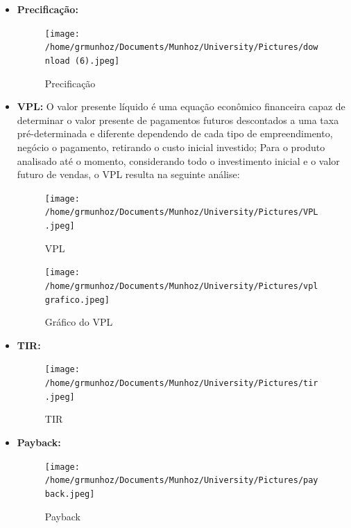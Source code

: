 \documentclass[
	12pt,				%
	openright,			%
	oneside,			%
	a4paper,			%
	english,			%
	french,				%
	spanish,			%
	brazil				%
	]{abntex2}
\begin{document}
\begin{itemize}
\item \textbf{Precificação:}

\begin{figure}[H]
\begin{center}
\caption{Precificação}
\texttt{[image: /home/grmunhoz/Documents/Munhoz/University/Pictures/download (6).jpeg]} 
\end{center}
\end{figure}	

\item \textbf{VPL:}
\subitem O valor presente líquido é uma equação econômico financeira capaz de determinar o valor presente de pagamentos futuros descontados a uma taxa pré-determinada e diferente dependendo de cada tipo de empreendimento, negócio o pagamento, retirando o custo inicial investido;
\subitem Para o produto analisado até o momento, considerando todo o investimento inicial e o valor futuro de vendas, o VPL resulta na seguinte análise:

\begin{figure}[H]
\begin{center}
\caption{VPL}
\texttt{[image: /home/grmunhoz/Documents/Munhoz/University/Pictures/VPL.jpeg]} 
\end{center}
\end{figure}	

\begin{figure}[H]
\begin{center}
\caption{Gráfico do VPL}
\texttt{[image: /home/grmunhoz/Documents/Munhoz/University/Pictures/vplgrafico.jpeg]} 
\end{center}
\end{figure}	

\item \textbf{TIR:}

\begin{figure}[H]
\begin{center}
\caption{TIR}
\texttt{[image: /home/grmunhoz/Documents/Munhoz/University/Pictures/tir.jpeg]} 
\end{center}
\end{figure}	

\item \textbf{Payback:}

\begin{figure}[H]
\begin{center}
\caption{Payback}
\texttt{[image: /home/grmunhoz/Documents/Munhoz/University/Pictures/payback.jpeg]} 
\end{center}
\end{figure}	

\end{itemize}
\end{document}
